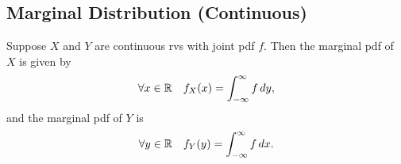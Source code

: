 \documentclass[notoc,notitlepage]{tufte-book}
\begin{document}
\subsection{Marginal Distribution (Continuous)}%
\label{sub:marginal_distribution_continuous}

\begin{defn}
\label{defn:marginal_pdf}
  Suppose $X$ and $Y$ are continuous rvs with joint pdf $f$. Then the marginal pdf of $X$ is given by
  \begin{equation*}
    \forall x \in \mathbb{R} \quad f_X(x) = \int_{-\infty}^{\infty} f \mathop{}\!d{y},
  \end{equation*}
  and the marginal pdf of $Y$ is
  \begin{equation*}
    \forall y \in \mathbb{R} \quad f_Y(y) = \int_{-\infty}^{\infty} f \mathop{}\!d{x}.
  \end{equation*}
\end{defn}
\end{document}
